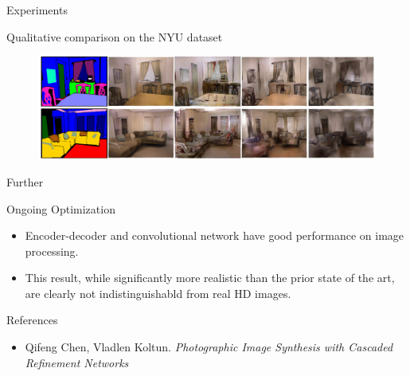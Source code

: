 \documentclass[notes]{beamer}
\begin{document}
\begin{frame}{Experiments}
	\begin{block}{Qualitative comparison on the NYU dataset}
		\begin{figure}
			\includegraphics[width=1.0\textwidth]{4.png}
		\end{figure}
	\end{block}
\end{frame}

\begin{frame}{Further}
	\begin{block}{Ongoing Optimization}
		\begin{itemize}
			\item Encoder-decoder and convolutional network have good performance on image processing.
			\item This result, while significantly more realistic than the prior state of the art, are clearly not indistinguishabld from real HD images.
		\end{itemize}
	\end{block}
\end{frame}


\begin{frame}{References}
	\begin{itemize}
		\item Qifeng Chen, Vladlen Koltun. \textit{Photographic Image Synthesis with Cascaded Refinement Networks}
	
	\end{itemize}
\end{frame}
\end{document}
